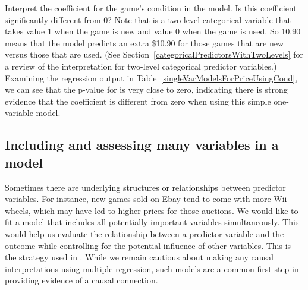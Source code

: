 \textC{\pagebreak}

\begin{example}{Interpret the coefficient for the game's condition in the model. Is this coefficient significantly different from 0?}
Note that  is a two-level categorical variable that takes value 1 when the game is new and value 0 when the game is used. So 10.90 means that the model predicts an extra \$10.90 for those games that are new versus those that are used. (See Section~\ref{categoricalPredictorsWithTwoLevels} for a review of the interpretation for two-level categorical predictor variables.) Examining the regression output in Table~\ref{singleVarModelsForPriceUsingCond}, we can see that the p-value for  is very close to zero, indicating there is strong evidence that the coefficient is different from zero when using this simple one-variable model.
\end{example}

\subsection{Including and assessing many variables in a model}
\label{includingAndAssessingManyVariablesInAModel}

Sometimes there are underlying structures or relationships between predictor variables. For instance, new games sold on Ebay tend to come with more Wii wheels, which may have led to higher prices for those auctions. We would like to fit a model that includes all potentially important variables simultaneously. This would help us evaluate the relationship between a predictor variable and the outcome while controlling for the potential influence of other variables. This is the strategy used in . While we remain cautious about making any causal interpretations using multiple regression, such models are a common first step in providing evidence of a causal connection.

\textC{\pagebreak}

